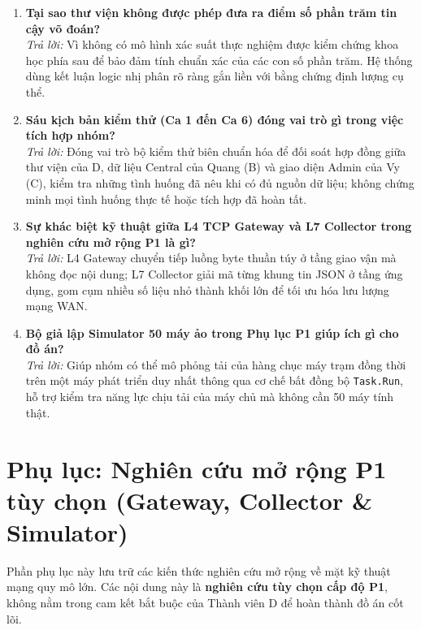 \documentclass[12pt,a4paper]{article}
\begin{document}
\begin{enumerate}[label=\textbf{\arabic*.}]
  \item \textbf{Tại sao thư viện không được phép đưa ra điểm số phần trăm tin cậy võ đoán?} \\
    \textit{Trả lời:} Vì không có mô hình xác suất thực nghiệm được kiểm chứng khoa học phía sau để bảo đảm tính chuẩn xác của các con số phần trăm. Hệ thống dùng kết luận logic nhị phân rõ ràng gắn liền với bằng chứng định lượng cụ thể.

  \item \textbf{Sáu kịch bản kiểm thử (Ca 1 đến Ca 6) đóng vai trò gì trong việc tích hợp nhóm?} \\
    \textit{Trả lời:} Đóng vai trò bộ kiểm thử biên chuẩn hóa để đối soát hợp đồng giữa thư viện của D, dữ liệu Central của Quang (B) và giao diện Admin của Vy (C), kiểm tra những tình huống đã nêu khi có đủ nguồn dữ liệu; không chứng minh mọi tình huống thực tế hoặc tích hợp đã hoàn tất.

  \item \textbf{Sự khác biệt kỹ thuật giữa L4 TCP Gateway và L7 Collector trong nghiên cứu mở rộng P1 là gì?} \\
    \textit{Trả lời:} L4 Gateway chuyển tiếp luồng byte thuần túy ở tầng giao vận mà không đọc nội dung; L7 Collector giải mã từng khung tin JSON ở tầng ứng dụng, gom cụm nhiều số liệu nhỏ thành khối lớn để tối ưu hóa lưu lượng mạng WAN.

  \item \textbf{Bộ giả lập Simulator 50 máy ảo trong Phụ lục P1 giúp ích gì cho đồ án?} \\
    \textit{Trả lời:} Giúp nhóm có thể mô phỏng tải của hàng chục máy trạm đồng thời trên một máy phát triển duy nhất thông qua cơ chế bất đồng bộ \texttt{Task.Run}, hỗ trợ kiểm tra năng lực chịu tải của máy chủ mà không cần 50 máy tính thật.
\end{enumerate}



\section*{Phụ lục: Nghiên cứu mở rộng P1 tùy chọn (Gateway, Collector \& Simulator)}

\begin{summarybox}
Phần phụ lục này lưu trữ các kiến thức nghiên cứu mở rộng về mặt kỹ thuật mạng quy mô lớn. Các nội dung này là \textbf{nghiên cứu tùy chọn cấp độ P1}, không nằm trong cam kết bắt buộc của Thành viên D để hoàn thành đồ án cốt lõi.
\end{summarybox}
\end{document}
